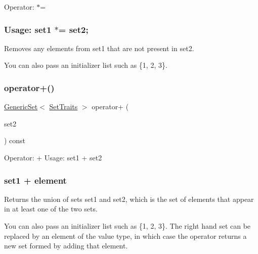 Operator\+: $\ast$= \subsubsection*{Usage\+: set1 $\ast$= set2; }

Removes any elements from {\ttfamily set1} that are not present in {\ttfamily set2}. 

You can also pass an initializer list such as \{1, 2, 3\}. \mbox{\label{classstanfordcpplib_1_1collections_1_1GenericSet_afea3af6c9d038b2965e152623d790723}} 
\subsubsection{\texorpdfstring{operator+()}{operator+()}\hspace{0.1cm}{\footnotesize\ttfamily [1/2]}}
{\footnotesize\ttfamily \mbox{\hyperlink{classstanfordcpplib_1_1collections_1_1GenericSet}{Generic\+Set}}$<$ \mbox{\hyperlink{structstanfordcpplib_1_1collections_1_1SetTraits}{Set\+Traits}} $>$ operator+ (\begin{DoxyParamCaption}\item[{const \mbox{\hyperlink{classstanfordcpplib_1_1collections_1_1GenericSet}{Generic\+Set}}$<$ \mbox{\hyperlink{structstanfordcpplib_1_1collections_1_1SetTraits}{Set\+Traits}} $>$ \&}]{set2 }\end{DoxyParamCaption}) const}



Operator\+: + Usage\+: set1 + set2 \subsubsection*{set1 + element }

Returns the union of sets {\ttfamily set1} and {\ttfamily set2}, which is the set of elements that appear in at least one of the two sets. 

You can also pass an initializer list such as \{1, 2, 3\}. The right hand set can be replaced by an element of the value type, in which case the operator returns a new set formed by adding that element. \mbox{\label{classstanfordcpplib_1_1collections_1_1GenericSet_afa15583f3e2d538799d56f6ac04608b9}} 
